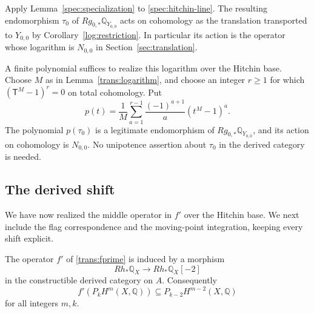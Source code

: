Apply Lemma~\ref{spec:specialization} to \eqref{spec:hitchin-line}.  The
resulting endomorphism $\tau_0$ of $Rg_{0,*}\mathbb Q_{Y_{0,0}}$ acts on
cohomology as the translation transported to $Y_{0,0}$ by
Corollary~\ref{log:restriction}.  In particular its action is the operator
whose logarithm is $N_{0,0}$ in Section~\ref{sec:translation}.

A finite polynomial suffices to realize this logarithm over the Hitchin
base.  Choose $M$ as in Lemma~\ref{trans:logarithm}, and choose an integer
$r\ge1$ for which $(\mathsf T^M-1)^r=0$ on total cohomology.  Put
\[
 p(t)=\frac1M\sum_{a=1}^{r-1}
       \frac{(-1)^{a+1}}{a}(t^M-1)^a.
\]
The polynomial $p(\tau_0)$ is a legitimate endomorphism of
$Rg_{0,*}\mathbb Q_{Y_{0,0}}$, and its action on cohomology is $N_{0,0}$.
No unipotence assertion about $\tau_0$ in the derived category is needed.

\subsection{The derived shift}

We have now realized the middle operator in $f'$ over the Hitchin base.
We next include the flag correspondence and the moving-point integration,
keeping every shift explicit.

\begin{proposition}\label{spec:perverse-lowering}
The operator $f'$ of \eqref{trans:fprime} is induced by a morphism
\begin{equation}\label{spec:derived-lowering}
 Rh_*\mathbb Q_X\longrightarrow Rh_*\mathbb Q_X[-2]
\end{equation}
in the constructible derived category on $A$.  Consequently
\[
 f'(P_kH^m(X,\mathbb Q))\subseteq P_{k-2}H^{m-2}(X,\mathbb Q)
\]
for all integers $m,k$.
\end{proposition}

